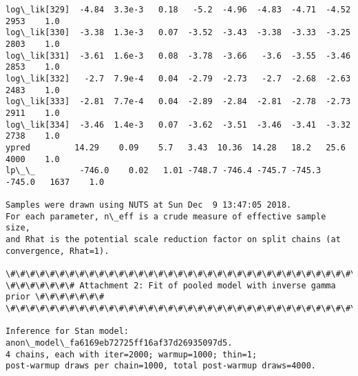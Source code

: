 \documentclass[11pt]{article}
\begin{document}
\begin{Verbatim}[commandchars=\\\{\}]
log\_lik[329]  -4.84  3.3e-3   0.18   -5.2  -4.96  -4.83  -4.71  -4.52   2953    1.0
log\_lik[330]  -3.38  1.3e-3   0.07  -3.52  -3.43  -3.38  -3.33  -3.25   2803    1.0
log\_lik[331]  -3.61  1.6e-3   0.08  -3.78  -3.66   -3.6  -3.55  -3.46   2853    1.0
log\_lik[332]   -2.7  7.9e-4   0.04  -2.79  -2.73   -2.7  -2.68  -2.63   2483    1.0
log\_lik[333]  -2.81  7.7e-4   0.04  -2.89  -2.84  -2.81  -2.78  -2.73   2911    1.0
log\_lik[334]  -3.46  1.4e-3   0.07  -3.62  -3.51  -3.46  -3.41  -3.32   2738    1.0
ypred         14.29    0.09    5.7   3.43  10.36  14.28   18.2   25.6   4000    1.0
lp\_\_         -746.0    0.02   1.01 -748.7 -746.4 -745.7 -745.3 -745.0   1637    1.0

Samples were drawn using NUTS at Sun Dec  9 13:47:05 2018.
For each parameter, n\_eff is a crude measure of effective sample size,
and Rhat is the potential scale reduction factor on split chains (at 
convergence, Rhat=1).

\#\#\#\#\#\#\#\#\#\#\#\#\#\#\#\#\#\#\#\#\#\#\#\#\#\#\#\#\#\#\#\#\#\#\#\#\#\#\#\#\#\#\#\#\#\#\#\#\#\#\#\#\#\#\#\#\#\#\#\#\#\#\#\#\#\#\#\#\#\#\#\#\#\#
\#\#\#\#\#\#\# Attachment 2: Fit of pooled model with inverse gamma prior \#\#\#\#\#\#\#
\#\#\#\#\#\#\#\#\#\#\#\#\#\#\#\#\#\#\#\#\#\#\#\#\#\#\#\#\#\#\#\#\#\#\#\#\#\#\#\#\#\#\#\#\#\#\#\#\#\#\#\#\#\#\#\#\#\#\#\#\#\#\#\#\#\#\#\#\#\#\#\#\#\#

Inference for Stan model: anon\_model\_fa6169eb72725ff16af37d26935097d5.
4 chains, each with iter=2000; warmup=1000; thin=1; 
post-warmup draws per chain=1000, total post-warmup draws=4000.


\end{Verbatim}
\end{document}

